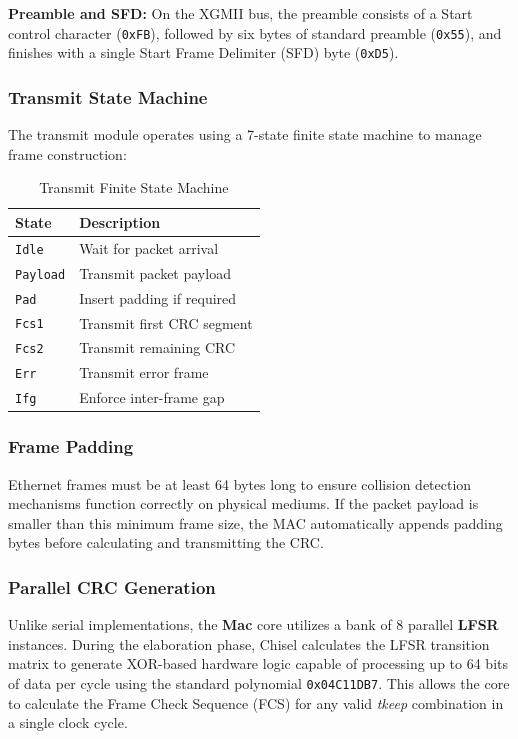 \textbf{Preamble and SFD:} On the XGMII bus, the preamble consists of a Start control character (\texttt{0xFB}), followed by six bytes of standard preamble (\texttt{0x55}), and finishes with a single Start Frame Delimiter (SFD) byte (\texttt{0xD5}).

\subsubsection{Transmit State Machine}
The transmit module operates using a 7-state finite state machine to manage frame construction:

\begin{table}[H]
\centering
\begin{tabular}{|l|l|}
\hline
\textbf{State} & \textbf{Description} \\ \hline \hline
\texttt{Idle} & Wait for packet arrival \\ \hline
\texttt{Payload} & Transmit packet payload \\ \hline
\texttt{Pad} & Insert padding if required \\ \hline
\texttt{Fcs1} & Transmit first CRC segment \\ \hline
\texttt{Fcs2} & Transmit remaining CRC \\ \hline
\texttt{Err} & Transmit error frame \\ \hline
\texttt{Ifg} & Enforce inter-frame gap \\ \hline
\end{tabular}
\caption{Transmit Finite State Machine}\label{table:tx_fsm}
\end{table}

\subsubsection{Frame Padding}
Ethernet frames must be at least 64 bytes long to ensure collision detection mechanisms function correctly on physical mediums. If the packet payload is smaller than this minimum frame size, the MAC automatically appends padding bytes before calculating and transmitting the CRC. 

\subsubsection{Parallel CRC Generation}
Unlike serial implementations, the \textbf{Mac} core utilizes a bank of 8 parallel \textbf{LFSR} instances. During the elaboration phase, Chisel calculates the LFSR transition matrix to generate XOR-based hardware logic capable of processing up to 64 bits of data per cycle using the standard polynomial \texttt{0x04C11DB7}. This allows the core to calculate the Frame Check Sequence (FCS) for any valid \textit{tkeep} combination in a single clock cycle.

